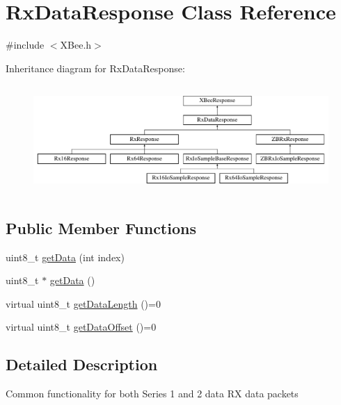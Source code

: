 \hypertarget{classRxDataResponse}{\section{\-Rx\-Data\-Response \-Class \-Reference}
\label{classRxDataResponse}
}


{\ttfamily \#include $<$\-X\-Bee.\-h$>$}

\-Inheritance diagram for \-Rx\-Data\-Response\-:\begin{figure}[H]
\begin{center}
\leavevmode
\includegraphics[height=4.166667cm]{classRxDataResponse}
\end{center}
\end{figure}
\subsection*{\-Public \-Member \-Functions}
\begin{DoxyCompactItemize}
\item 
uint8\-\_\-t \hyperlink{classRxDataResponse_a28db0306283f4191e4fc8a5b049486f5}{get\-Data} (int index)
\item 
uint8\-\_\-t $\ast$ \hyperlink{classRxDataResponse_ae0f858fe479a07c7122a8d414c60517e}{get\-Data} ()
\item 
virtual uint8\-\_\-t \hyperlink{classRxDataResponse_a5845e6a0719fd0bf52675e47053a704e}{get\-Data\-Length} ()=0
\item 
virtual uint8\-\_\-t \hyperlink{classRxDataResponse_a9e4b6bf4f1bfd9ccec45d190a204f61a}{get\-Data\-Offset} ()=0
\end{DoxyCompactItemize}


\subsection{\-Detailed \-Description}
\-Common functionality for both \-Series 1 and 2 data \-R\-X data packets 

